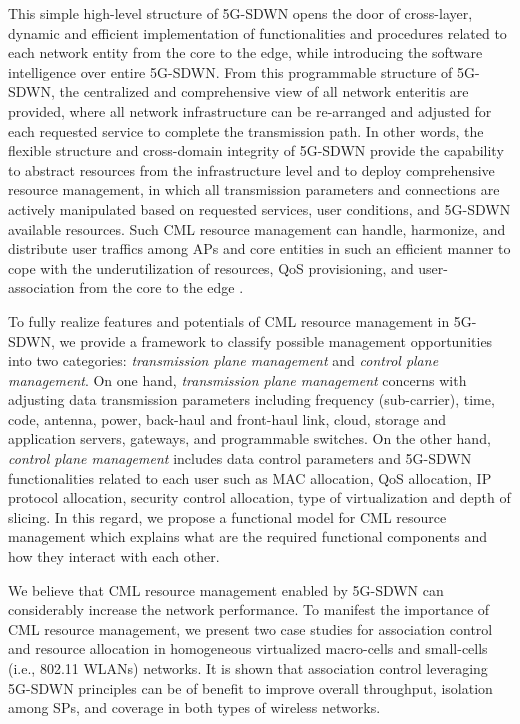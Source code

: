 \documentclass[conference]{IEEEtran}
\begin{document}
This simple high-level structure of 5G-SDWN opens the door of cross-layer, dynamic and efficient implementation of functionalities and procedures related to each network entity from the core to the edge, while introducing the software intelligence over entire 5G-SDWN. From this programmable structure of 5G-SDWN, the centralized and comprehensive view of all network enteritis are provided, where all network infrastructure can be re-arranged and adjusted for each requested service to complete the transmission path. In other words, the flexible structure and cross-domain integrity of 5G-SDWN provide the capability to abstract resources from the infrastructure level and to deploy comprehensive resource management, in which all transmission parameters and connections are actively manipulated based on requested services, user conditions, and 5G-SDWN available resources.  Such CML resource management can handle, harmonize, and distribute user traffics among APs and core entities in such an efficient manner to cope with the underutilization of resources, QoS provisioning, and user-association from the core to the edge \cite{leon2003virtual,lin2014enabling,kang2013savi}.


To fully realize features and potentials of CML resource management in 5G-SDWN, we provide a framework to classify possible management opportunities into two categories: \textit{transmission plane management} and \textit{control plane management}. On one hand, \textit{transmission plane management} concerns with adjusting data transmission parameters including frequency (sub-carrier), time, code, antenna, power, back-haul and front-haul link, cloud, storage and application servers, gateways, and programmable switches. On the other hand, \textit{control plane management} includes data control parameters and 5G-SDWN functionalities related to each user such as  MAC allocation, QoS allocation, IP protocol allocation, security control allocation, type of virtualization and depth of slicing. In this regard, we propose a functional model for CML resource management which explains what are the required functional components and how they interact with each other.

We believe that CML resource management enabled by 5G-SDWN can considerably increase the network performance.  To manifest the importance of CML resource management, we present two case studies for association control and resource allocation in homogeneous virtualized macro-cells and small-cells (i.e., 802.11 WLANs) networks. It is shown that association control leveraging 5G-SDWN principles can be of benefit to improve overall throughput, isolation among SPs, and coverage in both types of wireless networks.
\end{document}
